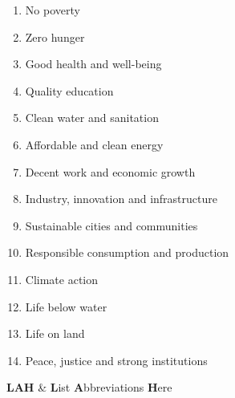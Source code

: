 \documentclass[a4paper, 11pt, oneside]{uet_thesis}  %
\begin{document}
\begin{enumerate}[itemsep=0em]
	\item No poverty
	\item Zero hunger
	\item Good health and well-being
	\item Quality education
	\item Clean water and sanitation
	\item Affordable and clean energy
	\item Decent work and economic growth
	\item Industry, innovation and infrastructure
	\item Sustainable cities and communities
	\item Responsible consumption and production
	\item Climate action
	\item Life below water
	\item Life on land
	\item Peace, justice and strong institutions
\end{enumerate}

\clearpage	%

\pagestyle{fancy}  %

\tableofcontents  %

\listoffigures  %

\listoftables  %


\clearpage  %

{
\textbf{LAH} & \textbf{L}ist \textbf{A}bbreviations \textbf{H}ere \\
}
\end{document}
